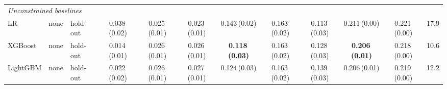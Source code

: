 \begin{table}[!tbp]
{\begin{tabular}{lllccccccccc}
\midrule
\multicolumn{12}{l}{\textit{Unconstrained baselines}} \\
LR & none & hold-out & 0.038\,{\scriptsize(0.02)} & 0.025\,{\scriptsize(0.01)} & 0.023\,{\scriptsize(0.01)} & 0.143\,{\scriptsize(0.02)} & 0.163\,{\scriptsize(0.02)} & 0.113\,{\scriptsize(0.03)} & 0.211\,{\scriptsize(0.00)} & 0.221\,{\scriptsize(0.00)} & 17.9 \\
XGBoost & none & hold-out & 0.014\,{\scriptsize(0.01)} & 0.026\,{\scriptsize(0.01)} & 0.026\,{\scriptsize(0.01)} & \textbf{0.118\,{\scriptsize(0.03)}} & 0.163\,{\scriptsize(0.02)} & 0.128\,{\scriptsize(0.03)} & \textbf{0.206\,{\scriptsize(0.01)}} & 0.218\,{\scriptsize(0.00)} & 10.6 \\
LightGBM & none & hold-out & 0.022\,{\scriptsize(0.02)} & 0.026\,{\scriptsize(0.01)} & 0.027\,{\scriptsize(0.01)} & 0.124\,{\scriptsize(0.03)} & 0.163\,{\scriptsize(0.02)} & 0.139\,{\scriptsize(0.03)} & 0.206\,{\scriptsize(0.01)} & 0.219\,{\scriptsize(0.00)} & 12.2 \\
\bottomrule\end{tabular}}
\end{table}